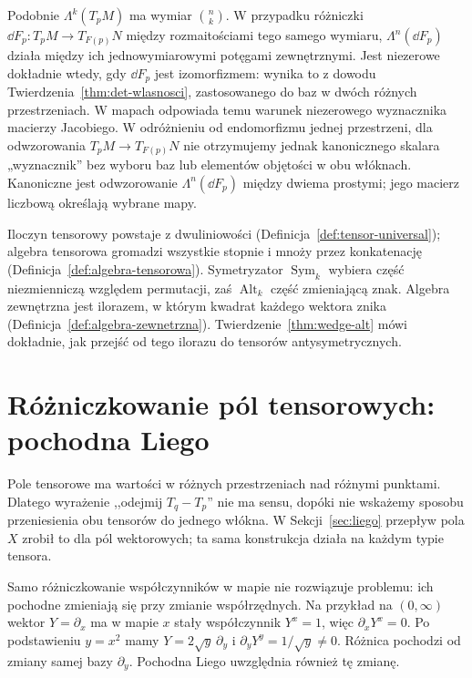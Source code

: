 Podobnie $\Lambda^k(T_pM)$ ma wymiar $\binom nk$.
W przypadku różniczki $\dd F_p\colon T_pM\to T_{F(p)}N$
między rozmaitościami tego samego wymiaru,
$\Lambda^n(\dd F_p)$ działa między ich jednowymiarowymi
potęgami zewnętrznymi. Jest niezerowe dokładnie wtedy,
gdy $\dd F_p$ jest izomorfizmem: wynika to z dowodu
Twierdzenia~\ref{thm:det-wlasnosci}, zastosowanego do baz
w dwóch różnych przestrzeniach. W mapach odpowiada temu
warunek niezerowego wyznacznika macierzy Jacobiego.
W odróżnieniu od endomorfizmu jednej przestrzeni, dla odwzorowania
$T_pM\to T_{F(p)}N$ nie otrzymujemy jednak kanonicznego skalara
„wyznacznik” bez wyboru baz lub elementów objętości w obu włóknach.
Kanoniczne jest odwzorowanie $\Lambda^n(\dd F_p)$ między
dwiema prostymi; jego macierz liczbową określają wybrane mapy.

\begin{uwaga}
Iloczyn tensorowy powstaje z dwuliniowości
(Definicja~\ref{def:tensor-universal}); algebra tensorowa
gromadzi wszystkie stopnie i mnoży przez konkatenację
(Definicja~\ref{def:algebra-tensorowa}). Symetryzator
$\operatorname{Sym}_k$ wybiera część niezmienniczą względem
permutacji, zaś $\operatorname{Alt}_k$ część zmieniającą znak.
Algebra zewnętrzna jest ilorazem, w którym kwadrat każdego
wektora znika (Definicja~\ref{def:algebra-zewnetrzna}).
Twierdzenie~\ref{thm:wedge-alt} mówi dokładnie, jak przejść
od tego ilorazu do tensorów antysymetrycznych.
\end{uwaga}

\section{Różniczkowanie pól tensorowych: pochodna Liego}
\label{sec:lie-tensory}

Pole tensorowe ma wartości w różnych przestrzeniach nad
różnymi punktami. Dlatego wyrażenie ,,odejmij $T_q-T_p$''
nie ma sensu, dopóki nie wskażemy sposobu przeniesienia
obu tensorów do jednego włókna. W Sekcji~\ref{sec:liego}
przepływ pola $X$ zrobił to dla pól wektorowych;
ta sama konstrukcja działa na każdym typie tensora.

Samo różniczkowanie współczynników w mapie nie rozwiązuje
problemu: ich pochodne zmieniają się przy zmianie współrzędnych.
Na przykład na $(0,\infty)$ wektor $Y=\partial_x$ ma w
mapie $x$ stały współczynnik $Y^x=1$, więc
$\partial_xY^x=0$. Po podstawieniu $y=x^2$ mamy
$Y=2\sqrt y\,\partial_y$ i
$\partial_yY^y=1/\sqrt y\ne0$.
Różnica pochodzi od zmiany samej bazy $\partial_y$.
Pochodna Liego uwzględnia również tę zmianę.

